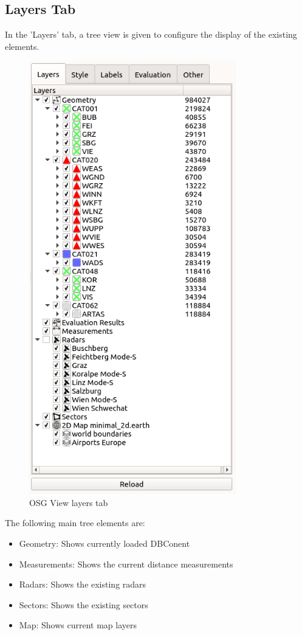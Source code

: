 \subsection{Layers Tab}

In the 'Layers' tab, a tree view is given to configure the display of the existing elements. 

\begin{figure}[H]
  \center
    \includegraphics[width=9cm,frame]{figures/osgview_config_panel.png}
  \caption{OSG View layers tab}
\end{figure}

The following main tree elements are:\\

\begin{itemize}
 \item Geometry: Shows currently loaded DBConent
 \item Measurements: Shows the current distance measurements
 \item Radars: Shows the existing radars 
 \item Sectors: Shows the existing sectors
 \item Map: Shows current map layers
\end{itemize} 
 \ \\

